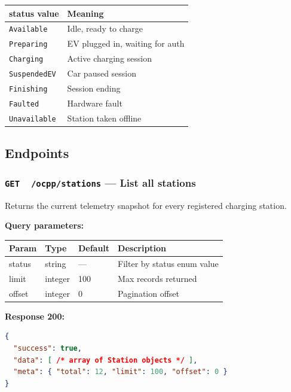 \documentclass{article}
\newcommand{\GET}{\colorbox{evblue!20}{\texttt{\textbf{\color{evblue}GET}}}}
\begin{document}
\begin{center}
\begin{tabular}{ll}
\toprule
\textbf{status value} & \textbf{Meaning}\\
\midrule
\texttt{Available}   & Idle, ready to charge\\
\texttt{Preparing}   & EV plugged in, waiting for auth\\
\texttt{Charging}    & Active charging session\\
\texttt{SuspendedEV} & Car paused session\\
\texttt{Finishing}   & Session ending\\
\texttt{Faulted}     & Hardware fault\\
\texttt{Unavailable} & Station taken offline\\
\bottomrule
\end{tabular}
\end{center}

\subsection{Endpoints}

\subsubsection{\GET\ \ \texttt{/ocpp/stations} --- List all stations}

Returns the current telemetry snapshot for every registered charging station.

\textbf{Query parameters:}

\begin{center}
\begin{tabular}{>{\ttfamily}llll}
\toprule
\textbf{Param} & \textbf{Type} & \textbf{Default} & \textbf{Description}\\
\midrule
status & string & --- & Filter by status enum value\\
limit  & integer & 100 & Max records returned\\
offset & integer & 0 & Pagination offset\\
\bottomrule
\end{tabular}
\end{center}

\textbf{Response 200:}
\begin{lstlisting}[language=json, caption=GET /ocpp/stations response]
{
  "success": true,
  "data": [ /* array of Station objects */ ],
  "meta": { "total": 12, "limit": 100, "offset": 0 }
}
\end{lstlisting}
\end{document}
